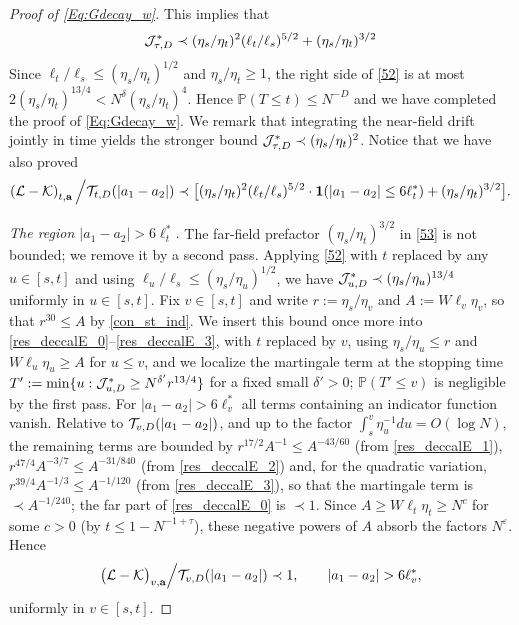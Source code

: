 \documentclass[10pt,reqno]{article}
\theoremstyle{plain} %
\theoremstyle{remark}
\numberwithin{equation}{section}
\begin{document}
\begin{proof}[Proof of \eqref{Eq:Gdecay_w}]
 
This implies that 
\begin{align}\label{52}
 {\cal J}^*_{\tau,D}\prec     (\eta_s/\eta_t)^{2}(\ell_t/\ell_s)^{5/2}+(\eta_s/\eta_t)^{3/2}  
\end{align}
Since $\ell_t/\ell_s\le(\eta_s/\eta_t)^{1/2}$ and $\eta_s/\eta_t\ge 1$, the right side of \eqref{52} is at most $2(\eta_s/\eta_t)^{13/4} < N^{\delta}(\eta_s/\eta_t)^4$. Hence  ${\mathbb P} (T\le t )\le N^{-D}$ and we have completed  the proof of \eqref{Eq:Gdecay_w}.
We remark that integrating the near-field drift jointly in time yields the stronger bound ${\cal J}^*_{\tau,D}\prec(\eta_s/\eta_t)^{2}$.
 Notice that we have also proved 
\begin{align}\label{53}
\left({\cal L}-{\cal K}\right)_{t, \textbf{a}}\Big/{\cal T}_{t, D}(|a_1-a_2|) \prec   \big [ (\eta_s/\eta_t)^{2}(\ell_t/\ell_s)^{5/2}  \cdot {\bf 1}(|a_1-a_2|\le 6\ell_t^*)+(\eta_s/\eta_t)^{3/2} \big ].
\end{align}

\smallskip
\noindent\emph{The region $|a_1-a_2|>6\ell^*_t$.} The far-field prefactor $(\eta_s/\eta_t)^{3/2}$ in \eqref{53} is not bounded; we remove it by a second pass. Applying \eqref{52} with $t$ replaced by any $u\in[s,t]$ and using $\ell_u/\ell_s\le(\eta_s/\eta_u)^{1/2}$, we have ${\cal J}^*_{u,D}\prec(\eta_s/\eta_u)^{13/4}$ uniformly in $u\in[s,t]$. Fix $v\in[s,t]$ and write $r:=\eta_s/\eta_v$ and $A:=W\ell_v\eta_v$, so that $r^{30}\le A$ by \eqref{con_st_ind}. We insert this bound once more into \eqref{res_deccalE_0}--\eqref{res_deccalE_3}, with $t$ replaced by $v$, using $\eta_s/\eta_u\le r$ and $W\ell_u\eta_u\ge A$ for $u\le v$, and we localize the martingale term at the stopping time $T':=\min\{u:{\cal J}^*_{u,D}\ge N^{\delta'}r^{13/4}\}$ for a fixed small $\delta'>0$; ${\mathbb P}(T'\le v)$ is negligible by the first pass. For $|a_1-a_2|>6\ell^*_v$ all terms containing an indicator function vanish. Relative to ${\cal T}_{v,D}(|a_1-a_2|)$, and up to the factor $\int_s^v\eta_u^{-1}du=O(\log N)$, the remaining terms are bounded by $r^{17/2}A^{-1}\le A^{-43/60}$ (from \eqref{res_deccalE_1}), $r^{47/4}A^{-3/7}\le A^{-31/840}$ (from \eqref{res_deccalE_2}) and, for the quadratic variation, $r^{39/4}A^{-1/3}\le A^{-1/120}$ (from \eqref{res_deccalE_3}), so that the martingale term is $\prec A^{-1/240}$; the far part of \eqref{res_deccalE_0} is $\prec 1$. Since $A\ge W\ell_t\eta_t\ge N^{c}$ for some $c>0$ (by $t\le 1-N^{-1+\tau}$), these negative powers of $A$ absorb the factors $N^{\varepsilon}$. Hence
\begin{equation*}
\big({\cal L}-{\cal K}\big)_{v, \textbf{a}}\Big/{\cal T}_{v, D}(|a_1-a_2|) \prec 1,\qquad |a_1-a_2|>6\ell_v^*,
\end{equation*}
uniformly in $v\in[s,t]$.

    
\end{proof}
 
\end{document}
